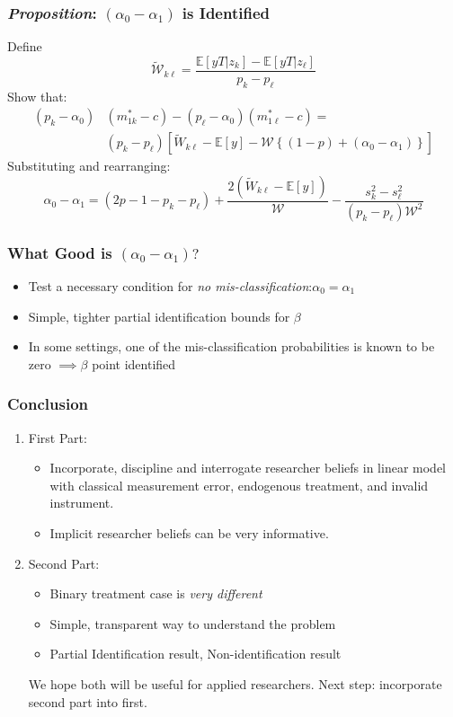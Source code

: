 \documentclass{beamer}
\begin{document}
\begin{frame}
  \frametitle{\emph{Proposition}: $(\alpha_0 - \alpha_1)$ is Identified}
  Define
\begin{equation*}
  \widetilde{\mathcal{W}}_{k\ell} = \frac{\mathbb{E}[yT|z_k] - \mathbb{E}[yT|z_\ell]}{p_k - p_\ell}
\end{equation*}
Show that:
\begin{align*}
(p_k - \alpha_0)&(m^*_{1k}-c) - (p_\ell - \alpha_0)(m^*_{1\ell}-c) =\\
& (p_k - p_\ell)\left[ \widetilde{W}_{k\ell} - \mathbb{E}[y] - \mathcal{W}\left\{ (1 - p) + (\alpha_0 - \alpha_1) \right\} \right]
\end{align*}
Substituting and rearranging: 
\begin{equation*}
  \alpha_0 - \alpha_1 = (2p - 1 - p_k - p_\ell) + \frac{2(\widetilde{W}_{k\ell} - \mathbb{E}[y])}{\mathcal{W}} - \frac{s_k^2 - s_\ell^2}{(p_k - p_\ell)\mathcal{W}^2}
\end{equation*}
\end{frame}
\begin{frame}
  \frametitle{What Good is $(\alpha_0 - \alpha_1)?$}
    \begin{itemize}
      \item Test a necessary condition for \emph{no mis-classification}:$\alpha_0 = \alpha_1$ 
      \item Simple, tighter partial identification bounds for $\beta$
      \item In some settings, one of the mis-classification probabilities is known to be zero $\implies \beta$ point identified 
    \end{itemize}
\end{frame}
\begin{frame}
  \frametitle{Conclusion}
  \begin{enumerate}
    \item First Part:
  \begin{itemize}
    \item Incorporate, discipline and interrogate researcher beliefs in linear model with classical measurement error, endogenous treatment, and invalid instrument. 
    \item Implicit researcher beliefs can be very informative.
  \end{itemize}
\item Second Part:
  \begin{itemize}
    \item Binary treatment case is \emph{very different} 
    \item Simple, transparent way to understand the problem
    \item Partial Identification result, Non-identification result 
  \end{itemize}
  \alert{We hope both will be useful for applied researchers. Next step: incorporate second part into first.}
  \end{enumerate}
\end{frame}
\end{document}

